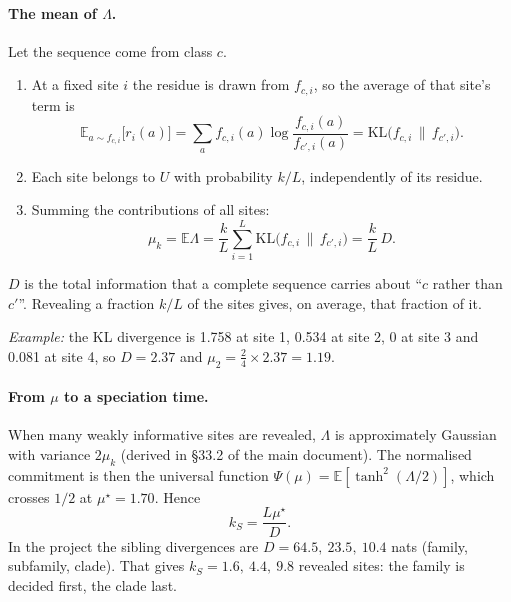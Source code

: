 \documentclass[11pt,a4paper]{article}
\newcommand{\E}{\mathbb{E}}
\begin{document}
\paragraph{The mean of $\Lambda$.} Let the sequence come from class $c$.
\begin{enumerate}[nosep]
\item At a fixed site $i$ the residue is drawn from $f_{c,i}$, so the average of that site's term is
\[
\E_{a\sim f_{c,i}}\big[r_i(a)\big]=\sum_af_{c,i}(a)\log\frac{f_{c,i}(a)}{f_{c',i}(a)}=\mathrm{KL}\big(f_{c,i}\,\|\,f_{c',i}\big).
\]
\item Each site belongs to $U$ with probability $k/L$, independently of its residue.
\item Summing the contributions of all sites:
\[
\mu_k=\E\Lambda=\frac kL\sum_{i=1}^L\mathrm{KL}\big(f_{c,i}\,\|\,f_{c',i}\big)=\frac kL\,D .
\]
\end{enumerate}
$D$ is the total information that a complete sequence carries about ``$c$ rather than $c'$''. Revealing a fraction $k/L$
of the sites gives, on average, that fraction of it.

\emph{Example:} the KL divergence is 1.758 at site 1, 0.534 at site 2, 0 at site 3 and 0.081 at site 4, so $D=2.37$ and
$\mu_2=\tfrac24\times2.37=1.19$.

\paragraph{From $\mu$ to a speciation time.} When many weakly informative sites are revealed, $\Lambda$ is approximately
Gaussian with variance $2\mu_k$ (derived in \S33.2 of the main document). The normalised commitment is then the universal
function $\Psi(\mu)=\E[\tanh^2(\Lambda/2)]$, which crosses $1/2$ at $\mu^\star=1.70$. Hence
\[
k_S=\frac{L\mu^\star}{D}.
\]
In the project the sibling divergences are $D=64.5,\ 23.5,\ 10.4$ nats (family, subfamily, clade). That gives
$k_S=1.6,\ 4.4,\ 9.8$ revealed sites: the family is decided first, the clade last.

\end{document}
